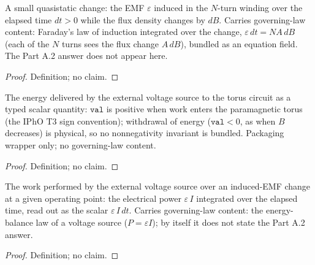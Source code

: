 \begin{definition}
\label{def:IPhO2026Problems_problem_IPhO_2026_3_A_2:InducedEMFChange}
A small quasistatic change: the EMF $\varepsilon$ induced in the $N$-turn
winding over the elapsed time $dt > 0$ while the flux density changes by $dB$.
Carries governing-law content: Faraday's law of induction integrated over the
change, $\varepsilon\,dt = N A\,dB$ (each of the $N$ turns sees the flux
change $A\,dB$), bundled as an equation field.  The Part A.2 answer does not
appear here.
\end{definition}
\begin{proof}
Definition; no claim.
\end{proof}

\begin{definition}
\label{def:IPhO2026Problems_problem_IPhO_2026_3_A_2:WorkOnSource}
The energy delivered by the external voltage source to the torus circuit as a
typed scalar quantity: $\mathtt{val}$ is positive when work enters the
paramagnetic torus (the IPhO T3 sign convention); withdrawal of energy
($\mathtt{val} < 0$, as when $B$ decreases) is physical, so no nonnegativity
invariant is bundled.  Packaging wrapper only; no governing-law content.
\end{definition}
\begin{proof}
Definition; no claim.
\end{proof}

\begin{definition}
\label{def:IPhO2026Problems_problem_IPhO_2026_3_A_2:sourceWork}
The work performed by the external voltage source over an induced-EMF change at
a given operating point: the electrical power $\varepsilon\,I$ integrated over
the elapsed time, read out as the scalar $\varepsilon\,I\,dt$.  Carries
governing-law content: the energy-balance law of a voltage source
($P = \varepsilon I$); by itself it does not state the Part A.2 answer.
\end{definition}
\begin{proof}
Definition; no claim.
\end{proof}

